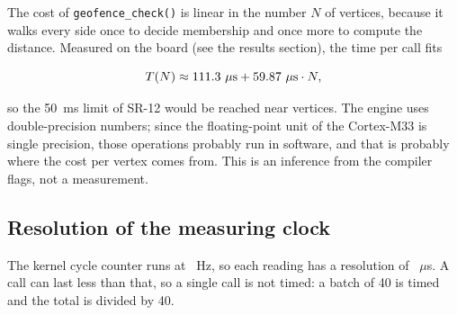 The cost of \texttt{geofence\_check()} is linear in the number $N$ of vertices, because it walks every side once
to decide membership and once more to compute the distance. Measured on the board (see the results section),
the time per call fits

\begin{equation}
T(N) \approx 111.3~\mu\text{s} + 59.87~\mu\text{s}\cdot N,
\end{equation}

so the 50~ms limit of SR-12 would be reached near \dBenchLimitVertices{} vertices. The engine uses
double-precision numbers; since the floating-point unit of the Cortex-M33 is single precision, those
operations probably run in software, and that is probably where the cost per vertex comes from. This is an
inference from the compiler flags, not a measurement.

\subsection{Resolution of the measuring clock}

The kernel cycle counter runs at \dClockHz~Hz, so each reading has a resolution of \dTickUs~$\mu$s. A call can
last less than that, so a single call is not timed: a batch of 40 is timed and the total is divided by 40.

